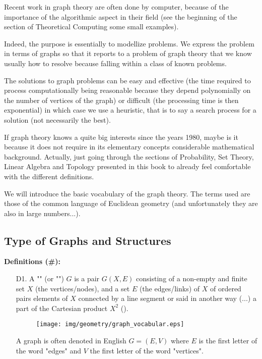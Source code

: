 {Recent work in graph theory are often done by computer, because of the importance of the algorithmic aspect in their field (see the beginning of the section of Theoretical Computing some small examples).

Indeed, the purpose is essentially to modellize problems. We express the problem in terms of graphs so that it reports to a problem of graph theory that we know usually how to resolve because falling within a class of known problems.

The solutions to graph problems can be easy and effective (the time required to process computationally being reasonable because they depend polynomially on the number of vertices of the graph) or difficult (the processing time is then exponential) in which case we use a heuristic, that is to say a search process for a solution (not necessarily the best).

	If graph theory knows a quite big interests since the years 1980, maybe is it because it does not require in its elementary concepts considerable mathematical background. Actually, just going through the sections of Probability, Set Theory,  Linear Algebra and Topology presented in this book  to already feel comfortable with the different definitions.

	We will introduce the basic vocabulary of the graph theory. The terms used are those of the common language of Euclidean geometry (and unfortunately they are also in large numbers...).

	\pagebreak
	\subsection{Type of Graphs and Structures}
	\textbf{Definitions (\#\mydef):}
	\begin{enumerate}
	\item[D1.] A "" (or "") $G$ is a pair $G(X,E)$ consisting of a non-empty and finite set $X$ (the vertices/nodes), and a set $E$ (the edges/links) of $X$ of ordered pairs elements of $X$ connected by a line segment or said in another way (...) a part of the Cartesian product $X^2$ ().
	
	\begin{figure}[H]
		\centering
		\texttt{[image: img/geometry/graph\_vocabular.eps]}
	\end{figure}
	
	\begin{tcolorbox}[title=Remark,colframe=black,arc=10pt]
	A graph is often denoted in English $G = (E, V)$ where $E$ is the first letter of the word "edges" and $V$ the first letter of the word "vertices".
	\end{tcolorbox}	
	

\end{enumerate}}
